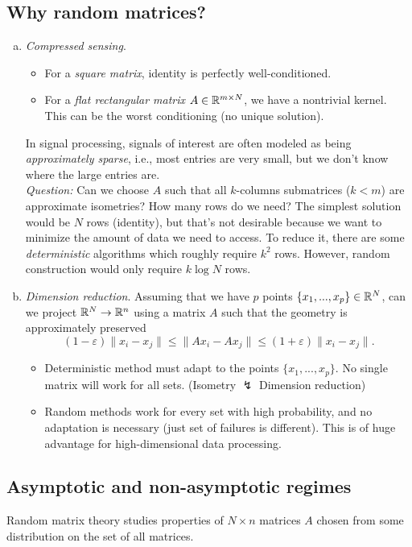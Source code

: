\subsection{Why random matrices?}
\begin{enumerate}[(a),itemsep=0pt]
\item \emph{Compressed sensing}. \vspace{-0.5pc}
\begin{itemize}[itemsep=0pt]
\item For a \emph{square matrix}, identity is perfectly well-conditioned.
\item For a \emph{flat rectangular matrix} $A \in \mathbb{R}^{m\times N}$, we have a nontrivial kernel. This can be the worst conditioning (no unique solution). \vspace{-0.5pc}
\end{itemize}
In signal processing, signals of interest are often modeled as being \emph{approximately sparse}, i.e., most entries are very small, but we don't know where the large entries are. \\
\emph{Question:} Can we choose $A$ such that all $k$-columns submatrices ($k<m$) are approximate isometries? How many rows do we need? The simplest solution would be $N$ rows (identity), but that's not desirable because we want to minimize the amount of data we need to access. To reduce it, there are some \emph{deterministic} algorithms which roughly require $k^2$ rows. However, random construction would only require $k\log N$ rows.
\item \emph{Dimension reduction}. Assuming that we have $p$ points $\{x_1,...,x_p\}\in \mathbb{R}^N$, can we project $\mathbb{R}^N \to \mathbb{R}^n$ using a matrix $A$ such that the geometry is approximately preserved
\begin{equation*}
(1-\varepsilon) \|x_i-x_j\| \leq \|Ax_i-Ax_j\| \leq (1+\varepsilon) \|x_i-x_j\|.
\end{equation*}
\begin{itemize}[itemsep=0pt]
\item Deterministic method must adapt to the points $\{x_1,...,x_p\}$. No single matrix will work for all sets. (Isometry $\lightning$ Dimension reduction)
\item Random methods work for every set with high probability, and no adaptation is necessary (just set of failures is different). This is of huge advantage for high-dimensional data processing.
\end{itemize}
\end{enumerate}
\subsection{Asymptotic and non-asymptotic regimes}
Random matrix theory studies properties of $N\times n$ matrices $A$ chosen from some distribution on the set of all matrices.
